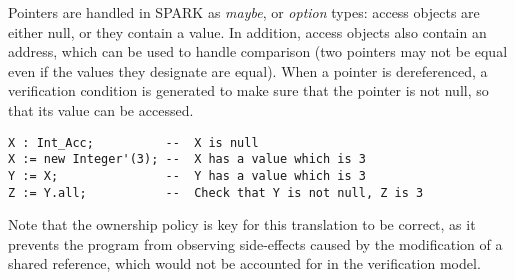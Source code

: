 \documentclass[runningheads]{llncs}
\begin{document}
Pointers are handled in SPARK as \emph{maybe}, or \emph{option} types: access objects are either null, or they contain a value. In addition, access objects also contain an address, which can be used to handle comparison (two pointers may not be equal even if the values they designate are equal). When a pointer is dereferenced, a verification condition is generated to make sure that the pointer is not null, so that its value can be accessed.
\begin{lstlisting}
X : Int_Acc;          --  X is null
X := new Integer'(3); --  X has a value which is 3
Y := X;               --  Y has a value which is 3
Z := Y.all;           --  Check that Y is not null, Z is 3
\end{lstlisting}
Note that the ownership policy is key for this translation to be correct, as it prevents the program from observing side-effects caused by the modification of a shared reference, which would not be accounted for in the verification model.
\end{document}
